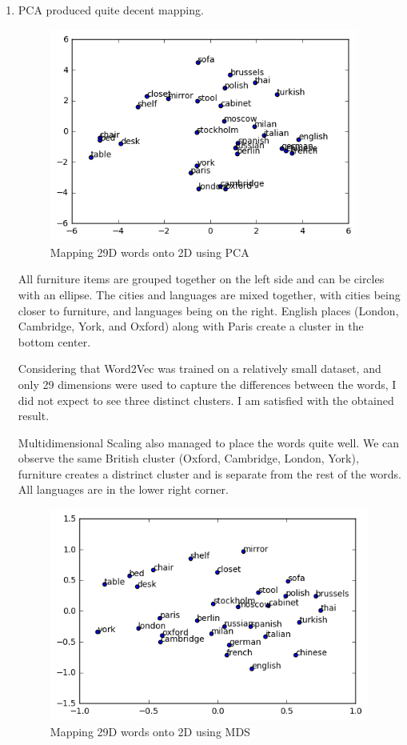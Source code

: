 \documentclass{article}
\begin{document}
\begin{enumerate}
\item

PCA produced quite decent mapping.

\begin{figure}[h!]
\begin{center}
\includegraphics[height=7cm]{pca}
\end{center}
\caption{Mapping 29D words onto 2D using PCA}
\end{figure}

All furniture items are grouped together on the left side and can be circles with an ellipse. The cities and languages are mixed together, with cities being closer to furniture, and languages being on the right. English places (London, Cambridge, York, and Oxford) along with Paris create a cluster in the bottom center.

Considering that Word2Vec was trained on a relatively small dataset, and only 29 dimensions were used to capture the differences between the words, I did not expect to see three distinct clusters. I am satisfied with the obtained result.

Multidimensional Scaling also managed to place the words quite well. We can observe the same British cluster (Oxford, Cambridge, London, York), furniture creates a distrinct cluster and is separate from the rest of the words. All languages are in the lower right corner.

\begin{figure}[h!]
\begin{center}
\includegraphics[height=7cm]{mds}
\end{center}
\caption{Mapping 29D words onto 2D using MDS}
\end{figure}


\end{enumerate}
\end{document}
